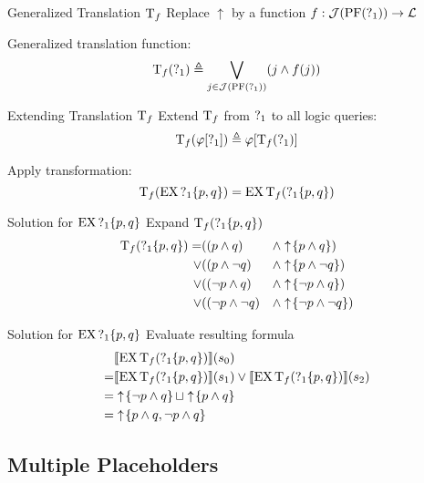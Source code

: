\begin{frame}{Generalized Translation $\operatorname{T}_f$}
  Replace $\uparrow$ by a function $f : \mathcal{J}(\operatorname{PF}(\operatorname{?}_1)) \to \mathcal{L}$

  Generalized translation function:
  \[ 
    \operatorname{T}_f(\operatorname{?}_1) \triangleq \bigvee_{j\in\mathcal{J}(\operatorname{PF}(\operatorname{?}_1))} (j \land f(j))
  \]
\end{frame}

\begin{frame}{Extending Translation $\operatorname{T}_f$}
  Extend $\operatorname{T}_f$ from $\operatorname{?}_1$ to all logic queries:
  \[ 
    \operatorname{T}_f(\varphi[\operatorname{?}_1]) \triangleq \varphi[\operatorname{T}_f(\operatorname{?}_1)]
  \]
  
  \begin{example}
    Apply transformation:
    \[ \operatorname{T}_f(\operatorname{EX} \operatorname{?}_1\{p,q\}) = \operatorname{EX}\operatorname{T}_f( \operatorname{?}_1\{p,q\}) \]
  \end{example}
\end{frame}

\begin{frame}{Solution for $\operatorname{EX} \operatorname{?}_1\{p,q\}$}
  Expand $\operatorname{T}_f( \operatorname{?}_1\{p,q\})$
  \begin{align*}
    \operatorname{T}_f( \operatorname{?}_1\{p,q\}) 
      =   &((p \land q) &&\land \uparrow \! \left\{ p\land q \right\}) \\
      \lor&((p \land \lnot q) &&\land \uparrow \! \left\{ p\land \lnot q \right\}) \\
      \lor&((\lnot p \land q) &&\land \uparrow \! \left\{ \lnot p\land q \right\}) \\
      \lor&((\lnot p \land \lnot q) &&\land \uparrow \! \left\{ \lnot p\land \lnot q \right\})
  \end{align*}
\end{frame}

\begin{frame}{Solution for $\operatorname{EX} \operatorname{?}_1\{p,q\}$}
  Evaluate resulting formula
  \begin{align*}
    & \llbracket \operatorname{EX} \operatorname{T}_f( \operatorname{?}_1\{p,q\}) \rrbracket (s_0) \\
      =& \llbracket \operatorname{EX} \operatorname{T}_f( \operatorname{?}_1\{p,q\}) \rrbracket (s_1) \lor \llbracket \operatorname{EX} \operatorname{T}_f( \operatorname{?}_1\{p,q\}) \rrbracket (s_2) \\
      =& \uparrow \! \left\{ \lnot p\land q \right\} \sqcup \uparrow \! \left\{ p\land q \right\} \\
      =& \uparrow \! \left\{ p\land q, \lnot p\land q \right\} 
  \end{align*}
\end{frame}

\subsection{Multiple Placeholders}%

